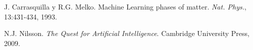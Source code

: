 \documentclass[12pt,oneside,openany]{memoir}
\begin{document}
\begin{thebibliography}{9}
J. Carrasquilla y R.G. Melko. Machine Learning phases of matter. \textit{Nat. Phys.}, 13:431-434, 1993.

N.J. Nilsson. \textit{The Quest for Artificial Intelligence}. Cambridge University Press, 2009.
 
% 
\end{thebibliography}
\end{document}
